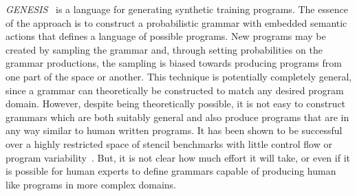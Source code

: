 \emph{GENESIS}~\cite{Chiu2015} is a language for generating synthetic training programs. The essence of the approach is to construct a probabilistic grammar with embedded semantic actions that defines a language of possible programs. New programs may be created by sampling the grammar and, through setting probabilities on the grammar productions, the sampling is biased towards producing programs from one part of the space or another. This technique is potentially completely general, since a grammar can theoretically be constructed to match any desired program domain. However, despite being theoretically possible, it is not easy to construct grammars which are both suitably general and also produce programs that are in any way similar to human written programs. It has been shown to be successful over a highly restricted space of stencil benchmarks with little control flow or program variability~\cite{Garvey2015b,Falch2015,Cummins2015}. But, it is not clear how much effort it will take, or even if it is possible for human experts to define grammars capable of producing human like programs in more complex domains.

